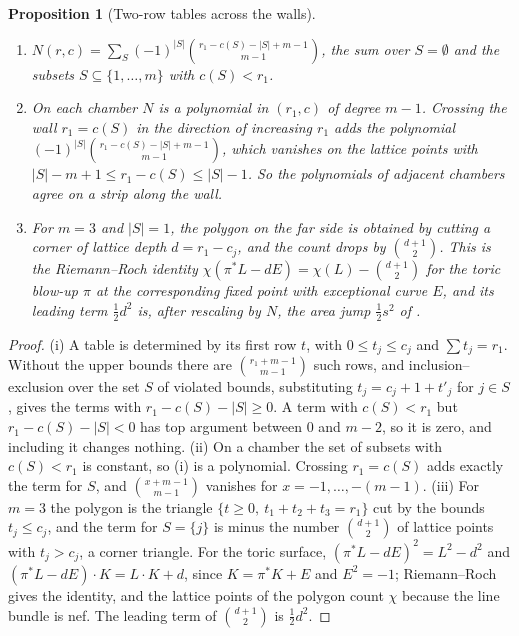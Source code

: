 \documentclass[11pt]{article}
\newtheorem{proposition}[theorem]{Proposition}
\theoremstyle{definition}
\theoremstyle{remark}
\begin{document}
\begin{proposition}[Two-row tables across the walls]\label{prop:twobym}
\begin{enumerate}[label=(\roman*)]
\item $N(r,c)=\sum_{S}(-1)^{|S|}\binom{r_1-c(S)-|S|+m-1}{m-1}$, the sum over $S=\emptyset$ and the subsets
  $S\subseteq\{1,\dots,m\}$ with $c(S)<r_1$.
\item On each chamber $N$ is a polynomial in $(r_1,c)$ of degree $m-1$. Crossing the wall $r_1=c(S)$ in the direction of
  increasing $r_1$ adds the polynomial $(-1)^{|S|}\binom{r_1-c(S)-|S|+m-1}{m-1}$, which vanishes on the lattice points with
  $|S|-m+1\le r_1-c(S)\le|S|-1$. So the polynomials of adjacent chambers agree on a strip along the wall.
\item For $m=3$ and $|S|=1$, the polygon on the far side is obtained by cutting a corner of lattice depth $d=r_1-c_j$, and the
  count drops by $\binom{d+1}2$. This is the Riemann--Roch identity $\chi(\pi^*L-dE)=\chi(L)-\binom{d+1}2$ for the toric blow-up
  $\pi$ at the corresponding fixed point with exceptional curve $E$, and its leading term $\frac12d^2$ is, after rescaling by $N$, the area
  jump $\frac12s^2$ of \cite[Prop.~10.6(i)]{Conditionals}.
\end{enumerate}
\end{proposition}
\begin{proof}
(i) A table is determined by its first row $t$, with $0\le t_j\le c_j$ and $\sum t_j=r_1$. Without the upper bounds there are
$\binom{r_1+m-1}{m-1}$ such rows, and inclusion--exclusion over the set $S$ of violated bounds, substituting $t_j=c_j+1+t'_j$ for
$j\in S$, gives the terms with $r_1-c(S)-|S|\ge0$. A term with $c(S)<r_1$ but $r_1-c(S)-|S|<0$ has top argument between $0$ and $m-2$,
so it is zero, and including it changes nothing. (ii) On a chamber the set of subsets with $c(S)<r_1$ is constant, so (i) is a polynomial.
Crossing $r_1=c(S)$ adds exactly the term for $S$, and $\binom{x+m-1}{m-1}$ vanishes for $x=-1,\dots,-(m-1)$. (iii) For $m=3$ the
polygon is the triangle $\{t\ge0,\ t_1+t_2+t_3=r_1\}$ cut by the bounds $t_j\le c_j$, and the term for $S=\{j\}$ is minus the number
$\binom{d+1}2$ of lattice points with $t_j>c_j$, a corner triangle. For the toric surface, $(\pi^*L-dE)^2=L^2-d^2$ and
$(\pi^*L-dE)\cdot K=L\cdot K+d$, since $K=\pi^*K+E$ and $E^2=-1$; Riemann--Roch gives the identity, and the lattice points of the
polygon count $\chi$ because the line bundle is nef. The leading term of $\binom{d+1}2$ is $\frac12d^2$.
\end{proof}
\end{document}
